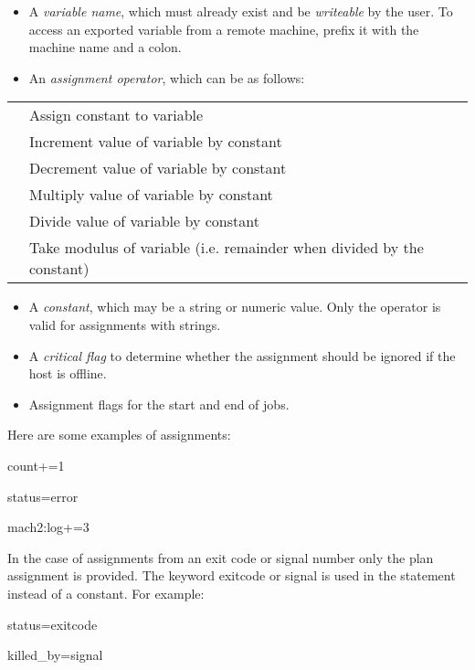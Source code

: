 \begin{itemize}
\item A \textit{variable name}, which must already exist and be \textit{writeable} by the user. To access an exported variable from a
remote machine, prefix it with the machine name and a colon.
\item An \textit{assignment operator}, which can be as follows:
\end{itemize}
\begin{center}
\begin{tabular}{l p{12cm}}
\exampletext{=} & Assign constant to variable\\
\exampletext{+=} & Increment value of variable by constant\\
\exampletext{{}-=} & Decrement value of variable by constant\\
\exampletext{*=} & Multiply value of variable by constant\\
\exampletext{/=} & Divide value of variable by constant\\
\exampletext{\%=} & Take modulus of variable (i.e. remainder when divided by the constant)\\
\end{tabular}
\end{center}

\begin{itemize}
\item A \textit{constant}, which may be a string or numeric value. Only the \exampletext{=} operator is valid for assignments with strings.
\item A \textit{critical flag} to determine whether the assignment should be ignored if the host is offline.
\item Assignment flags for the start and end of jobs.
\end{itemize}
Here are some examples of assignments:

\begin{expara}

count+=1

status=error

mach2:log+=3

\end{expara}

In the case of assignments from an exit code or signal number only the plan assignment is provided. The keyword exitcode or signal is used in
the statement instead of a constant. For example:

\begin{expara}

status=exitcode

killed\_by=signal

\end{expara}

